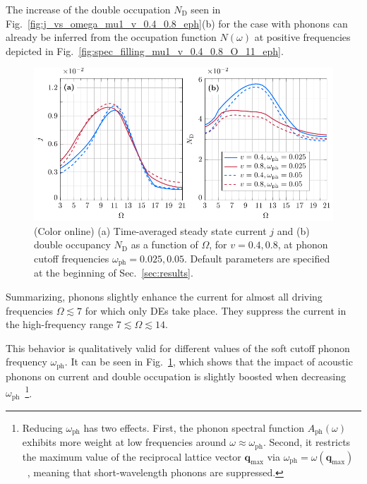 \documentclass[aps,prb,groupedaddress,showpacs,twocolumn,superscriptaddress,10pt]{revtex4-2}
\renewcommand{\vec}[1]{\bm{#1}} %
\begin{document}
The increase of the double occupation $N_{\text{D}}$ seen in Fig.~\ref{fig:j_vs_omega_mu1_v_0.4_0.8_eph}(b) for the case with phonons can already be inferred from the occupation function $N(\omega)$ at positive frequencies depicted in Fig.~\ref{fig:spec_filling_mu1_v_0.4_0.8_O_11_eph}.

\begin{figure}[t] 
\includegraphics[width=\linewidth]{Fig7.pdf}
\caption{(Color online) (a) Time-averaged steady state current $j$ and (b) double occupancy $N_{\text{D}}$ as a function of $\Omega$, for $v=0.4, 0.8$, at phonon cutoff frequencies $\omega_{\text{ph}}=0.025, 0.05$. Default parameters are specified at the beginning of Sec.~\ref{sec:results}.} 
\label{fig:j_vs_omega_mu1_v_0.4_0.8_E0_2_sweep_omegaph}
\end{figure}

Summarizing, phonons slightly enhance the current for almost all driving frequencies $\Omega\lesssim 7$ for which only DEs take place. They suppress the current in the high-frequency range $7\lesssim\Omega\lesssim14$.

This behavior is qualitatively valid for different values of the soft cutoff phonon frequency $\omega_{\text{ph}}$. It can be seen in Fig.~\ref{fig:j_vs_omega_mu1_v_0.4_0.8_E0_2_sweep_omegaph}, which shows that the impact of acoustic phonons on current and double occupation is slightly boosted when decreasing $\omega_{\text{ph}}$~\footnote{Reducing $\omega_{\text{ph}}$ has two effects. First, the phonon spectral function $A_{\text{ph}}(\omega)$ exhibits more weight at low frequencies around $\omega\approx\omega_{\text{ph}}$. Second, it restricts the maximum value of the reciprocal lattice vector $\vec{q}_{\text{max}}$ via $\omega_{\text{ph}}=\omega(\vec{q}_{\text{max}})$~\cite{ma.ga.22}, meaning that short-wavelength phonons are suppressed.}. 
     
\end{document}
